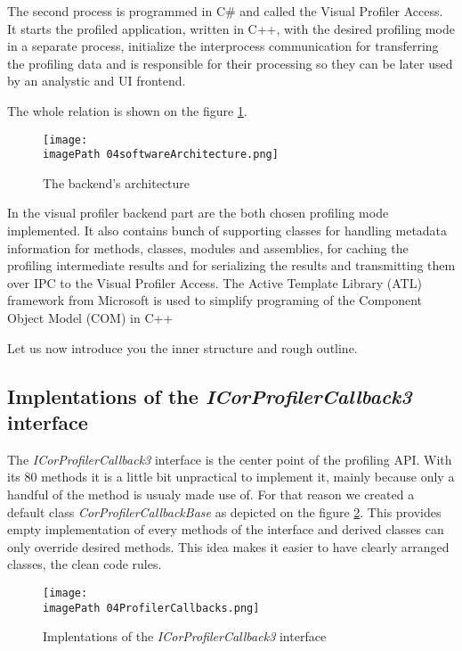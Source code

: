 The second process is programmed in C\# and called the Visual Profiler Access. It starts the profiled application, written in C++, with the desired profiling mode in a separate process, initialize the interprocess communication for transferring the profiling data and is responsible for their processing so they can be later used by an analystic and UI frontend.

The whole relation is shown on the figure \ref{fig:04softwareArchitecture}.

\begin{figure}
	\centering
		\texttt{[image: \\imagePath 04softwareArchitecture.png]}
		\caption{The backend's architecture}
	\label{fig:04softwareArchitecture}
\end{figure}

In the visual profiler backend part are the both chosen profiling mode implemented. It also contains bunch of supporting classes for handling metadata information for methods, classes, modules and assemblies, for caching the profiling intermediate results and for serializing the results and transmitting them over IPC to the Visual Profiler Access. The Active Template Library (ATL) framework from Microsoft is used to simplify programing of the Component Object Model (COM) in C++

Let us now introduce you the inner structure and rough outline.

\subsection{Implentations of the \textit{ICorProfilerCallback3 } interface}
The \textit{ICorProfilerCallback3} interface is the center point of the profiling API. With its 80 methods it is a little bit unpractical to implement it, mainly because only a handful of the method is usualy made use of. For that reason we created a default class \textit{CorProfilerCallbackBase} as depicted on the figure \ref{fig:04ProfilerCallbacks}. This provides empty implementation of every methods of the interface and derived classes can only override desired methods. This idea makes it easier to have clearly arranged classes, the clean code rules.

\begin{figure}
	\centering
		\texttt{[image: \\imagePath 04ProfilerCallbacks.png]}
		\caption{Implentations of the \textit{ICorProfilerCallback3} interface}
	\label{fig:04ProfilerCallbacks}
\end{figure}

